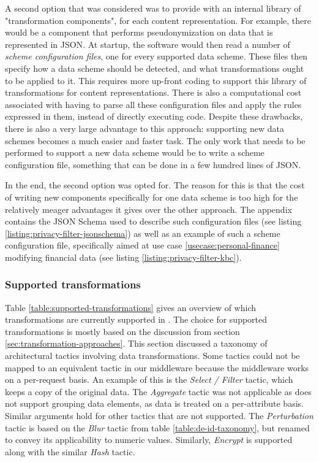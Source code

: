 A second option that was considered was to provide \middleware{} with an internal library of "transformation components", for each content representation. For example, there would be a component that performs pseudonymization on data that is represented in JSON. At startup, the software would then read a number of \textit{scheme configuration files}, one for every supported data scheme. These files then specify how a data scheme should be detected, and what transformations ought to be applied to it. This requires more up-front coding to support this library of transformations for content representations. There is also a computational cost associated with having to parse all these configuration files and apply the rules expressed in them, instead of directly executing code.
Despite these drawbacks, there is also a very large advantage to this approach: supporting new data schemes becomes a much easier and faster task. The only work that needs to be performed to support a new data scheme would be to write a scheme configuration file, something that can be done in a few hundred lines of JSON.

In the end, the second option was opted for. The reason for this is that the cost of writing new components specifically for one data scheme is too high for the relatively meager advantages it gives over the other approach. The appendix contains the JSON Schema used to describe such configuration files (see listing \ref{listing:privacy-filter-jsonschema}) as well as an example of such a scheme configuration file, specifically aimed at use case \ref{usecase:personal-finance} modifying financial data (see listing \ref{listing:privacy-filter-kbc}).

\subsubsection{Supported transformations}
Table \ref{table:supported-transformations} gives an overview of which transformations are currently supported in \middleware{}. The choice for supported transformations is mostly based on the discussion from section \ref{sec:transformation-approaches}. This section discussed a taxonomy of architectural tactics involving data transformations. Some tactics could not be mapped to an equivalent tactic in our middleware because the middleware works on a per-request basis. An example of this is the \textit{Select / Filter} tactic, which keeps a copy of the original data. The \textit{Aggregate} tactic was not applicable as \middleware{} does not support grouping data elements, as data is treated on a per-attribute basis. Similar arguments hold for other tactics that are not supported. The \textit{Perturbation} tactic is based on the \textit{Blur} tactic from table \ref{table:de-id-taxonomy}, but renamed to convey its applicability to numeric values. Similarly, \textit{Encrypt} is supported along with the similar \textit{Hash} tactic.

